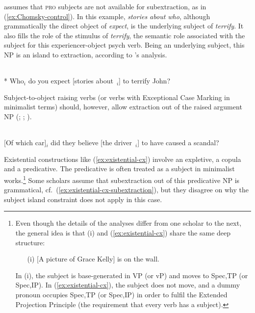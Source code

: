 \citet{Chomsky.1973} assumes that \textsc{pro} subjects are not available for subextraction, as in (\ref{ex:Chomsky-control}). In this example, \emph{stories about who}, although grammatically the direct object of \emph{expect}, is the underlying subject of \emph{terrify}. It also fills the role of the stimulus of \emph{terrify}, the semantic role associated with the subject for this experiencer-object psych verb. Being an underlying subject, this NP is an island to extraction, according to \citeauthor{Chomsky.1973}'s analysis.

\ea \citep[249]{Chomsky.1973}\\
 * Who$_i$ do you expect [stories about~\trace{}$_i$] to terrify John?
\label{ex:Chomsky-control}
\z 

Subject-to-object raising verbs (or verbs with Exceptional Case Marking in minimalist terms) should, however, allow extraction out of the raised argument NP (\citealt[20]{Chomsky.2005}; \citealt{Gallego.2007}; \citealt{Jimenez-Fernandez.2009}).

\ea \citep[109]{Jimenez-Fernandez.2009}\\
{}[Of which car]$_i$ did they believe [the driver~\trace{}$_i$] to have caused a scandal?
\z 

Existential constructions like (\ref{ex:existential-cx}) involve an expletive, a copula and a predicative. The predicative is often treated as a subject in minimalist works.\footnote{Even though the details of the analyses differ from one scholar to the next, the general idea is that (i) and (\ref{ex:existential-cx}) share the same deep structure:
\begin{itemize}
    \item[(i)] [A picture of Grace Kelly] is on the wall.
\end{itemize}
In (i), the subject is base-generated in VP (or vP) and moves to Spec,TP (or Spec,IP). In (\ref{ex:existential-cx}), the subject does not move, and a dummy pronoun occupies Spec,TP (or Spec,IP) in order to fulfil the Extended Projection Principle (the requirement that every verb has a subject).}  
Some scholars \citep[e.g.][]{Stepanov.2007,Uriagereka.2012} assume that subextraction out of this predicative NP is grammatical, cf.\  (\ref{ex:existential-cx-subextraction}), but they disagree on why the subject island constraint does not apply in this case.

